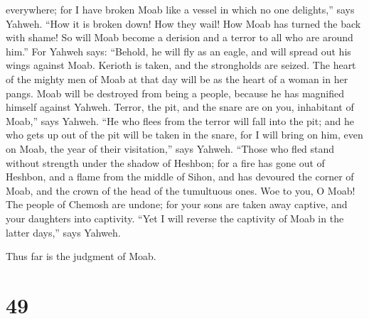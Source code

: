 everywhere; for I have broken Moab like a vessel in which no one
delights,'' says Yahweh.  ``How it is broken down! How they
wail! How Moab has turned the back with shame! So will Moab become a
derision and a terror to all who are around him.''  For
Yahweh says: ``Behold, he will fly as an eagle, and will spread out his
wings against Moab.  Kerioth is taken, and the strongholds
are seized. The heart of the mighty men of Moab at that day will be as
the heart of a woman in her pangs.  Moab will be destroyed
from being a people, because he has magnified himself against Yahweh.
 Terror, the pit, and the snare are on you, inhabitant of
Moab,'' says Yahweh.  ``He who flees from the terror will
fall into the pit; and he who gets up out of the pit will be taken in
the snare, for I will bring on him, even on Moab, the year of their
visitation,'' says Yahweh.  ``Those who fled stand without
strength under the shadow of Heshbon; for a fire has gone out of
Heshbon, and a flame from the middle of Sihon, and has devoured the
corner of Moab, and the crown of the head of the tumultuous ones.
 Woe to you, O Moab! The people of Chemosh are undone; for
your sons are taken away captive, and your daughters into captivity.
 ``Yet I will reverse the captivity of Moab in the latter
days,'' says Yahweh.

Thus far is the judgment of Moab.

\hypertarget{section-48}{%
\section{49}\label{section-48}}

